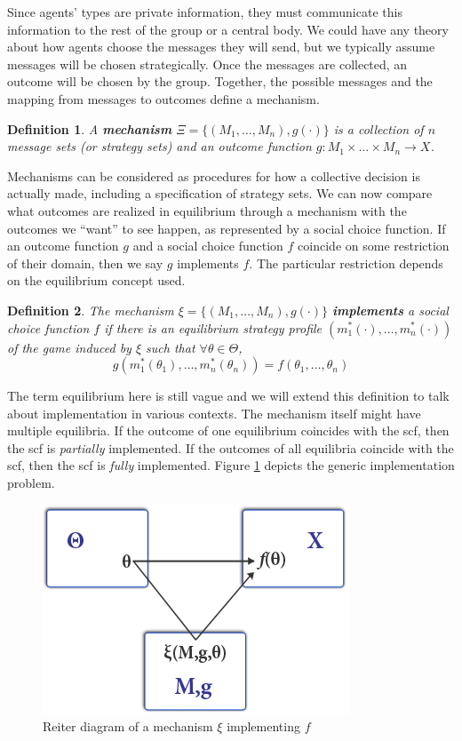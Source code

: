 \documentclass[letter, 10pt]{article}
\theoremstyle{basic}
\newtheorem{definition}{Definition}[section]
\begin{document}
\begin{spacing}{1.0}
Since agents' types are private information, they must communicate this
information to the rest of the group or a central body. We could have any
theory about how agents choose the messages they will send, but we
typically assume messages will be chosen strategically. Once the messages
are collected, an outcome will be chosen by the group. Together, the
possible messages and the mapping from messages to outcomes define a
mechanism.

\begin{definition}
  A \textbf{mechanism} $\Xi = \{(M_1, \ldots, M_n),
  g(\cdot)\}$ is a collection of $n$ message sets (or
  strategy sets) and an outcome function $g: M_1 \times
  \ldots \times M_n \to X$.
\end{definition}

Mechanisms can be considered as procedures for how a
collective decision is actually made, including a specification of
strategy sets. We can now compare what outcomes are
realized in equilibrium through a mechanism with the
outcomes we ``want'' to see happen, as represented by a
social choice function. If an outcome function $g$ and
a social choice function $f$ coincide on some restriction
of their domain, then we say $g$ implements $f$. The
particular restriction depends on the equilibrium concept used.

\begin{definition}
  The mechanism $\xi = \{(M_1, \ldots, M_n),
  g(\cdot)\}$ \textbf{implements} a social choice function $f$ if
  there is an equilibrium strategy profile
  $(m_1^*(\cdot), \ldots, m_n^*(\cdot))$ of the game
  induced by $\xi$ such that $\forall \theta \in \Theta$,
  \[g(m_1^*(\theta_1), \ldots, m_n^*(\theta_n)) =
  f(\theta_1, \ldots, \theta_n)\]
\end{definition}

The term equilibrium here is still vague and we will extend this definition
to talk about implementation in various contexts. The mechanism itself
might have multiple equilibria. If the outcome of one equilibrium coincides
with the scf, then the scf is \textit{partially} implemented. If the
outcomes of all equilibria coincide with the scf, then the scf is
\textit{fully} implemented.  Figure \ref{reiterdiagram} depicts the generic
implementation problem.


\begin{figure}[ht!]
  \centering
  \includegraphics[width=.45\columnwidth]{reiterdiagram}
    \caption{Reiter diagram of a
  mechanism $\xi$ implementing $f$}
\label{reiterdiagram}
\end{figure}


\end{spacing}
\end{document}
